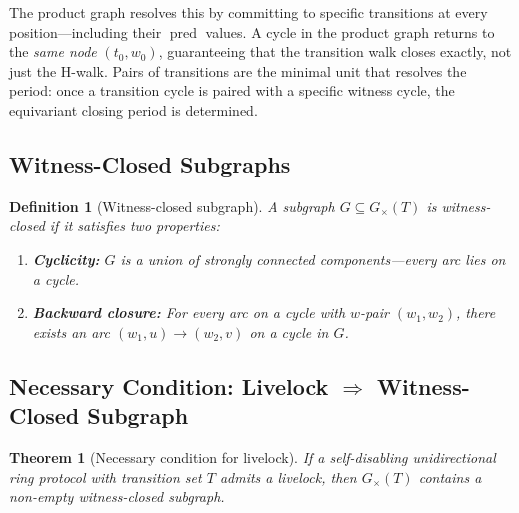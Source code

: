\documentclass[11pt]{article}
\newtheorem{theorem}{Theorem}
\newtheorem{definition}{Definition}
\begin{document}
The product graph resolves this by committing to specific transitions at every position---including their $\operatorname{pred}$ values. A cycle in the product graph returns to the \emph{same node} $(t_0, w_0)$, guaranteeing that the transition walk closes exactly, not just the H-walk. Pairs of transitions are the minimal unit that resolves the period: once a transition cycle is paired with a specific witness cycle, the equivariant closing period is determined.

\subsection{Witness-Closed Subgraphs}

\begin{definition}[Witness-closed subgraph]
\label{def:witness-closed}
A subgraph $G \subseteq G_\times(T)$ is \emph{witness-closed} if it satisfies two properties:
\begin{enumerate}[nosep]
\item \textbf{Cyclicity:} $G$ is a union of strongly connected components---every arc lies on a cycle.
\item \textbf{Backward closure:} For every arc on a cycle with $w$-pair $(w_1, w_2)$, there exists an arc $(w_1, u) \to (w_2, v)$ on a cycle in $G$.
\end{enumerate}
\end{definition}

\subsection{Necessary Condition: Livelock $\Rightarrow$ Witness-Closed Subgraph}

\begin{theorem}[Necessary condition for livelock]
\label{thm:necessary}
If a self-disabling unidirectional ring protocol with transition set $T$ admits a livelock, then $G_\times(T)$ contains a non-empty witness-closed subgraph.
\end{theorem}
\end{document}
